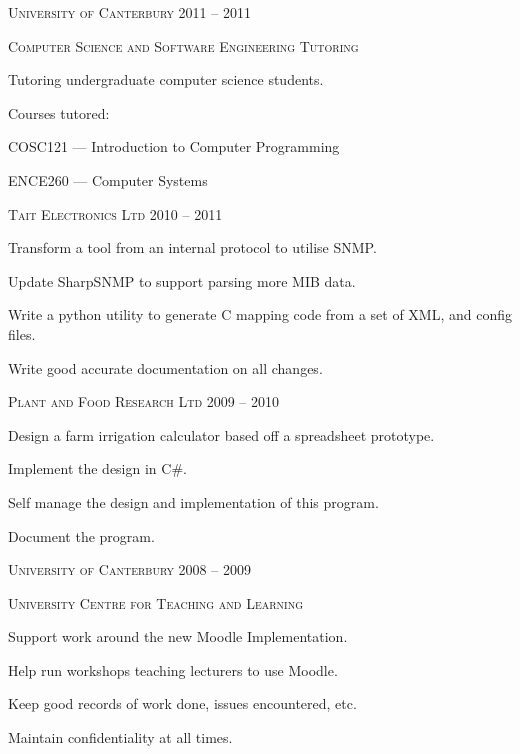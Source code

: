 \documentclass[10pt,a4]{article}
\newenvironment{packed_items}{
  \ignorespaces
  \begin{itemize}
  \small
}{
  \end{itemize}
  \ignorespacesafterend
}
\newcommand{\rightheadingstyle}[1]{{\color{dark}\large\scshape#1}\color{grey}}
\begin{document}
\begin{parcolumns}[colwidths={1=0.3\textwidth},nofirstindent]{2}
{      \rightheadingstyle{University of Canterbury \hfill 2011 -- 2011}

      \rightheadingstyle{\normalsize Computer Science and Software Engineering Tutoring}
      \begin{packed_items}
        \item{Tutoring undergraduate computer science students.}
        \item{Courses tutored:}
        \begin{packed_items}
          \item{COSC121 --- Introduction to Computer Programming}
          \item{ENCE260 --- Computer Systems}
        \end{packed_items}
      \end{packed_items}

      \rightheadingstyle{Tait Electronics Ltd \hfill 2010 -- 2011}
      \begin{packed_items}
        \item{Transform a tool from an internal protocol to utilise SNMP.}
        \item{Update SharpSNMP to support parsing more MIB data.}
        \item{Write a python utility to generate C mapping code from a set of XML, and config files.}
        \item{Write good accurate documentation on all changes.}
      \end{packed_items}

      \rightheadingstyle{Plant and Food Research Ltd \hfill 2009 -- 2010}
      \begin{packed_items}
        \item{Design a farm irrigation calculator based off a spreadsheet prototype.}
        \item{Implement the design in C\#.}
        \item{Self manage the design and implementation of this program.}
        \item{Document the program.}
      \end{packed_items}

      \rightheadingstyle{University of Canterbury \hfill 2008 -- 2009}

      \rightheadingstyle{\normalsize University Centre for Teaching and Learning}
      \begin{packed_items}
        \item{Support work around the new Moodle Implementation.}
        \item{Help run workshops teaching lecturers to use Moodle.}
        \item{Keep good records of work done, issues encountered, etc.}
        \item{Maintain confidentiality at all times.}
      \end{packed_items}
    }


\end{parcolumns}
\end{document}
